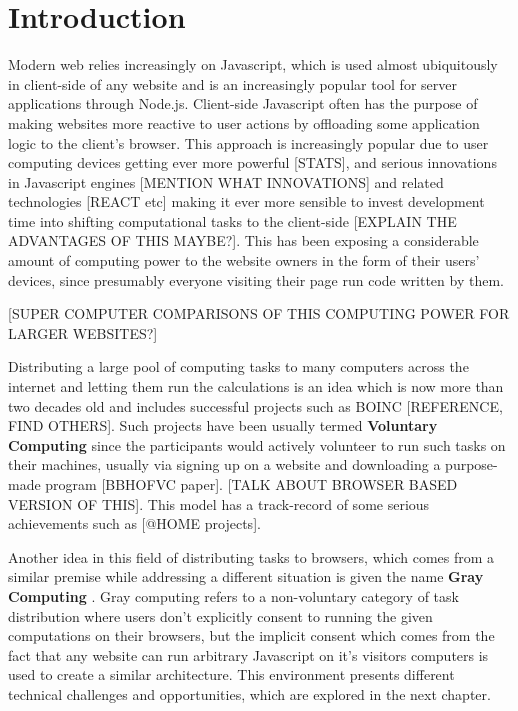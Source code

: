 \chapter{Introduction}
Modern web relies increasingly on Javascript, which is used almost ubiquitously in client-side of any website and is an increasingly popular tool for server applications through Node.js. 
Client-side Javascript often has the purpose of making websites more reactive to user actions by offloading some application logic to the client's browser. This approach is increasingly popular due to user computing devices getting ever more powerful [STATS], and serious innovations in Javascript engines [MENTION WHAT INNOVATIONS] and related technologies [REACT etc] making it ever more sensible to invest development time into shifting computational tasks to the client-side [EXPLAIN THE ADVANTAGES OF THIS MAYBE?].
This has been exposing a considerable amount of computing power to the website owners in the form of their users' devices, since presumably everyone visiting their page run code written by them.

[SUPER COMPUTER COMPARISONS OF THIS COMPUTING POWER FOR LARGER WEBSITES?]

Distributing a large pool of computing tasks to many computers across the internet and letting them run the calculations is an idea which is now more than two decades old and includes successful projects such as BOINC [REFERENCE, FIND OTHERS]. Such projects have been usually termed \textbf{Voluntary Computing} since the participants would actively volunteer to run such tasks on their machines, usually via signing up on a website and downloading a purpose-made program [BBHOFVC paper]. [TALK ABOUT BROWSER BASED VERSION OF THIS]. This model has a track-record of some serious achievements such as [@HOME projects].

Another idea in this field of distributing tasks to browsers, which comes from a similar premise while addressing a different situation is given the name \textbf{Gray Computing} \cite{pathak2013texture}. Gray computing refers to a non-voluntary category of task distribution where users don't explicitly consent to running the given computations on their browsers, but the implicit consent which comes from the fact that any website can run arbitrary Javascript on it's visitors computers is used to create a similar architecture. This environment presents different technical challenges and opportunities, which are explored in the next chapter.

